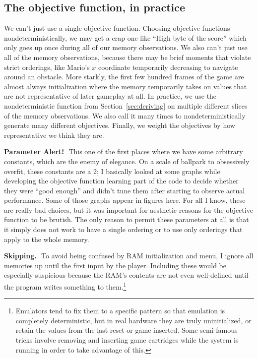 \documentclass[twocolumn]{article}
\newcommand\parameteralert[1]{
  {\bf Parameter Alert!}\,\, #1
}
\begin{document}
\subsection{The objective function, in practice}

We can't just use a single objective function. Choosing objective
functions nondeterministically, we may get a crap one like ``High byte
of the score'' which only goes up once during all of our memory
observations. We also can't just use all of the memory observations,
because there may be brief moments that violate strict orderings, like
Mario's $x$ coordinate temporarily decreasing to navigate around an
obstacle. More starkly, the first few hundred frames of the game are
almost always initialization where the memory temporarily takes on
values that are not representative of later gameplay at all. In
practice, we use the nondeterministic function from
Section~\ref{sec:deriving} on multiple different slices of the memory
observations. We also call it many times to nondeterministically
generate many different objectives. Finally, we weight the objectives
by how representative we think they are.

\parameteralert{This one of the first places where we have some
  arbitrary constants, which are the enemy of elegance. On a scale of
  ballpark to obsessively overfit, these constants are a 2; I
  basically looked at some graphs while developing the objective
  function learning part of the code to decide whether they were
  ``good enough'' and didn't tune them after starting to observe
  actual performance. Some of those graphs appear in figures here.
  For all I know, these are really bad choices, but it was important
  for aesthetic reasons for the objective function to be brutish. The
  only reason to permit these parameters at all is that it simply
  does not work to have a single ordering or to use only orderings
  that apply to the whole memory.}

{\bf Skipping.}\,\, To avoid being confused by RAM initialization and
menu, I ignore all memories up until the first input by the player.
Including these would be especially suspicious because the RAM's
contents are not even well-defined until the program writes something
to them.\footnote{Emulators tend to fix them to a specific pattern so
  that emulation is completely deterministic, but in real hardware
  they are truly uninitialized, or retain the values from the last
  reset or game inserted. Some semi-famous tricks involve removing
  and inserting game cartridges while the system is running in order
  to take advantage of this.}
\end{document}
